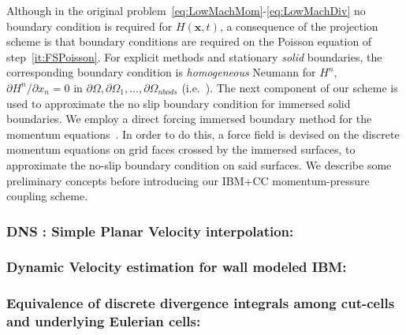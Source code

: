 \documentclass[12pt]{article}
\begin{document}
%
Although in the original problem~\eqref{eq:LowMachMom}-\eqref{eq:LowMachDiv} no boundary condition is required for $H(\mathbf{x},t)$, a consequence of the projection scheme is that boundary conditions are required on the Poisson equation of step~\eqref{it:FSPoisson}. For explicit methods and stationary \textit{solid} boundaries, the corresponding boundary condition is \textit{homogeneous} Neumann for $H^n$, $\partial H^n / \partial x_n =0$ in $\partial \Omega,\partial \Omega_1,...,\partial \Omega_{nbods}$ (i.e.~\cite{Perot:1993}).
The next component of our scheme is used to approximate the no slip boundary condition for immersed solid boundaries. We employ a direct forcing immersed boundary method for the momentum equations~\cite{Fadlun:2000}. In order to do this, a force field is devised on the discrete momentum equations on grid faces crossed by the immersed surfaces, to approximate the no-slip boundary condition on said surfaces. We describe some preliminary concepts before introducing our IBM+CC momentum-pressure coupling scheme.

\subsubsection{DNS : Simple Planar Velocity interpolation:}



\subsubsection{Dynamic Velocity estimation for wall modeled IBM:}




\subsubsection{Equivalence of discrete divergence integrals among cut-cells and underlying Eulerian cells:}
\end{document}
